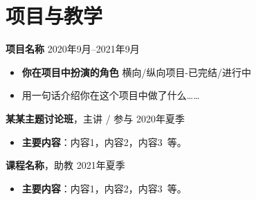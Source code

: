 \documentclass[11pt]{article} %
\newlength{\iconwidth}      %
\begin{document}
    \begin{minipage}[t]{\textwidth}
    \section[项目与教学]{\makebox[\iconwidth][c]{\color{primary_color}{\faChalkboardTeacher}}\quad 项目与教学}

    {\large \textbf{项目名称}} \hfill 2020年9月--2021年9月 %
    \begin{itemize}
        \item \textbf{你在项目中扮演的角色} \hfill 横向/纵向项目-已完结/进行中 %
        \item 用一句话介绍你在这个项目中做了什么\dots\dots %
    \end{itemize}

    \vspace{0.5em}
    {\large \textbf{某某主题讨论班}}，主讲 / 参与 \hfill 2020年夏季 %
    \begin{itemize}
        \item \textbf{主要内容}：内容1，内容2，内容3\ 等。 %
    \end{itemize}

    \vspace{0.5em}
    {\large \textbf{课程名称}}，助教 \hfill 2021年夏季 %
    \begin{itemize}
        \item \textbf{主要内容}：内容1，内容2，内容3\ 等。 %
    \end{itemize}

    \vspace{1.2em} %
    \end{minipage}
\end{document}
